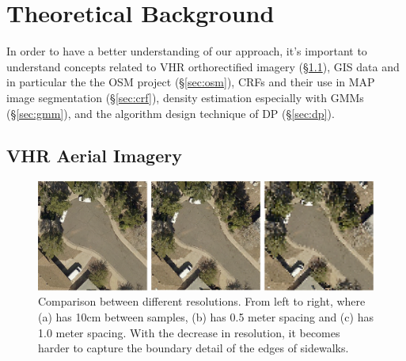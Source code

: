 \chapter{Theoretical Background}

In order to have a better understanding of our approach, it's important to understand concepts 
related to \ac{VHR} orthorectified imagery (\S\ref{sec:vhr}),
\ac{GIS} data and in particular the the \ac{OSM}  project (\S\ref{sec:osm}), 
\acp{CRF} and their use in \ac{MAP} image segmentation (\S\ref{sec:crf}),
density estimation especially with \acp{GMM} (\S\ref{sec:gmm}), and 
the algorithm design technique of \ac{DP} (\S\ref{sec:dp}). 

\section{\ac{VHR} Aerial Imagery}\label{sec:vhr}

\begin{figure}[H]
\centering
\includegraphics[width=\textwidth]{Figures/arz_7_res_compare.png}
\caption[Resolution Comparison]{
Comparison between different resolutions. 
From left to right, where
(a) has 10cm between samples, 
(b) has 0.5 meter spacing and 
(c) has 1.0 meter spacing. 
With the decrease in resolution,
it becomes harder to capture the boundary detail of the edges  of sidewalks.}
\label{fig:vhr_compare}
\end{figure}

